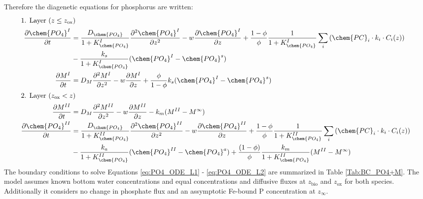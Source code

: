 \documentclass[gmd, manuscript]{copernicus}
\begin{document}
Therefore the diagenetic equations for phosphorus are written:
\begin{align}
\intertext{1. Layer ($z \leq z_{\mathrm{ox}}$)}
 \frac{\partial \chem{PO_4}^I}{\partial t} &= \frac{D_{\chem{PO_4}}}{1+K_{\chem{PO_4}}^I} \frac{\partial^2\chem{PO_4}^I }{\partial z^2} - w\frac{\partial \chem{PO_4}^I }{\partial z} + \frac{1-\phi}{\phi}\frac{1}{1+K_{\chem{PO_4}}^I}\sum_i 
					\left( \chem{PC}_i \cdot k_i \cdot C_{i}(z) \right) \notag\\
					& - \frac{k_{s}}{1+K_{\chem{PO_4}}^I}(\chem{PO_4}^I-\chem{PO_4}^s)\label{eq:PO4_ODE_L1}\\  %
 \frac{\partial M^I}{\partial t} &= D_{M}\frac{\partial^2M^I }{\partial z^2} - w\frac{\partial M^I }{\partial z} + \frac{\phi}{1-\phi}k_{s}(\chem{PO_4}^I-\chem{PO_4}^s)\label{eq:M_ODE_L1}\\  
 \intertext{2. Layer ($z_{\mathrm{ox}} < z$)} 
 \frac{\partial M^{II}}{\partial t} & = D_{M}\frac{\partial^2M^{II} }{\partial z^2} - w\frac{\partial M^{II} }{\partial z} - k_{m}(M^{II} - M^\infty)\label{eq:M_ODE_L2}\\  
 \frac{\partial \chem{PO_4}^{II}}{\partial t} &= \frac{D_{\chem{PO_4}}}{1+K_{\chem{PO_4}}^{II}} \frac{\partial^2\chem{PO_4}^{II} }{\partial z^2} - w\frac{\partial \chem{PO_4}^{II} }{\partial z} + \frac{1-\phi}{\phi} \frac{1}{1+K_{\chem{PO_4}}^{II}}\sum_i 
					\left( \chem{PC}_i \cdot k_i \cdot C_{i}(z) \right) \notag\\
					& - \frac{k_{a}}{1+K_{\chem{PO_4}}^{II}}(\chem{PO_4}^{II}-\chem{PO_4}^a) + \frac{(1-\phi)}{\phi}\frac{k_{m}}{1+K_{\chem{PO_4}}^{II}}(M^{II}-M^\infty)\label{eq:PO4_ODE_L2}\\
\end{align}
The boundary conditions to solve Equations \ref{eq:PO4_ODE_L1} - \ref{eq:PO4_ODE_L2} are summarized in Table \ref{Tab:BC_PO4+M}. 
The model assumes known bottom water concentrations and equal concentrations and diffusive fluxes at $z_{\mathrm{bio}}$ and $z_{\mathrm{ox}}$ for both species. Additionally it considers no change in phosphate flux and an assymptotic Fe-bound P 
concentration at $z_\infty$. \\
\end{document}
